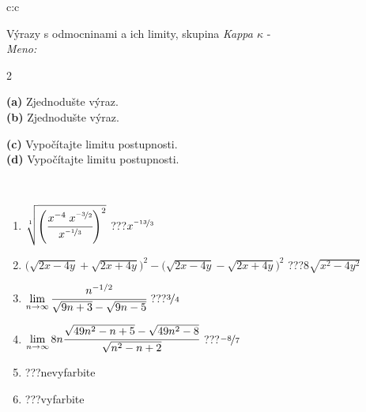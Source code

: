 \documentclass[10pt]{report}
\begin{document}
\begin{tabular}{c:c}
\begin{minipage}[c][104.5mm][t]{0.5\linewidth}
\begin{center}
\vspace{7mm}
{\huge {\Large Výrazy s odmocninami a ich limity}, skupina \textit{Kappa $\kappa$} -}\\[5mm]
\textit{Meno:}\phantom{xxxxxxxxxxxxxxxxxxxxxxxxxxxxxxxxxxxxxxxxxxxxxxxxxxxxxxxxxxxxxxxxx}\\[5mm]
\begin{minipage}{0.95\linewidth}
\begin{center}
{\small \begin{multicols}{2} \raggedright
\phantom{xxxxxxxxx}\textbf{(a)} Zjednodušte výraz. \\[1mm]
\phantom{xxxxxxxxx}\textbf{(b)} Zjednodušte výraz. \par \columnbreak
\textbf{(c)} Vypočítajte limitu postupnosti. \\[1mm]
\textbf{(d)} Vypočítajte limitu postupnosti.
\end{multicols}
}
\end{center}
\end{minipage}
\\[4mm]
\begin{minipage}{0.79\linewidth}
\begin{center}
\begin{varwidth}{\linewidth}
\begin{enumerate}
\small
\item $\sqrt[1]{\left(\cfrac{x^{-4}\;x^{\nicefrac{-3}{2}}}{x^{\nicefrac{-1}{3}}}\right)^{2}}$\quad \dotfill\; ???\;\dotfill \quad $x^{\nicefrac{-13}{3}}$
\item {\footnotesize{\scriptsize$\big(\sqrt{2x-4y}+\sqrt{2x+4y}\big)^2-\big(\sqrt{2x-4y}-\sqrt{2x+4y}\big)^2$}\quad \dotfill\; ???\;\dotfill \quad $8\sqrt{x^2-4y^2}$}
\item $\lim\limits_{n\to\infty}\cfrac{n^{-1/2}}{\sqrt{9n+3}-\sqrt{9n-5}}$\quad \dotfill\; ???\;\dotfill \quad $\nicefrac{3}{4}$
\item $\lim\limits_{n\to\infty}8n\cfrac{\sqrt{49n^2-n+5}-\sqrt{49n^2-8}}{\sqrt{n^2-n+2}}$\quad \dotfill\; ???\;\dotfill \quad $\nicefrac{-8}{7}$
\item \quad \dotfill\; ???\;\dotfill \quad nevyfarbite
\item \quad \dotfill\; ???\;\dotfill \quad vyfarbite
\end{enumerate}
\end{varwidth}

\end{center}
\end{minipage}
\end{center}
\end{minipage}
\end{tabular}
\end{document}
